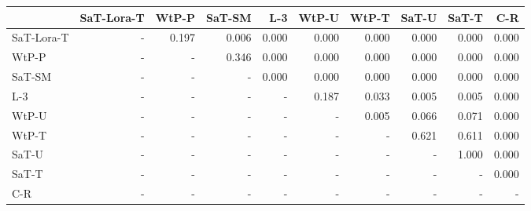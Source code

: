 \begin{tabular}{lrrrrrrrrr}
\toprule
 & SaT-Lora-T & WtP-P & SaT-SM & L-3 & WtP-U & WtP-T & SaT-U & SaT-T & C-R \\
\midrule
SaT-Lora-T & - & 0.197 & 0.006 & 0.000 & 0.000 & 0.000 & 0.000 & 0.000 & 0.000 \\
WtP-P & - & - & 0.346 & 0.000 & 0.000 & 0.000 & 0.000 & 0.000 & 0.000 \\
SaT-SM & - & - & - & 0.000 & 0.000 & 0.000 & 0.000 & 0.000 & 0.000 \\
L-3 & - & - & - & - & 0.187 & 0.033 & 0.005 & 0.005 & 0.000 \\
WtP-U & - & - & - & - & - & 0.005 & 0.066 & 0.071 & 0.000 \\
WtP-T & - & - & - & - & - & - & 0.621 & 0.611 & 0.000 \\
SaT-U & - & - & - & - & - & - & - & 1.000 & 0.000 \\
SaT-T & - & - & - & - & - & - & - & - & 0.000 \\
C-R & - & - & - & - & - & - & - & - & - \\
\bottomrule
\end{tabular}

